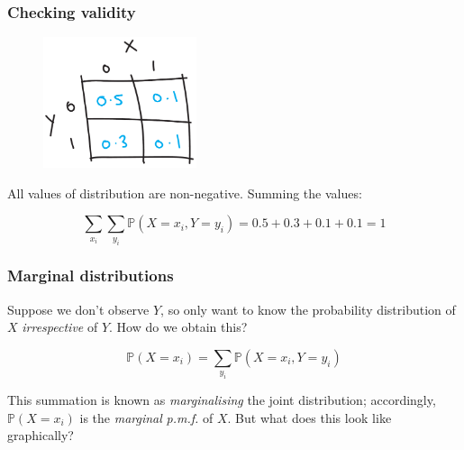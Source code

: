 \documentclass{beamer}
\begin{document}
	\begin{frame}
		\frametitle{Checking validity}
		
		\begin{figure}[ht]
			\centerline{\includegraphics[width=0.4\textwidth]{./figures/horse_race_base.pdf}}
		\end{figure}
		
		All values of distribution are non-negative. Summing the values:
		
		\begin{equation}
		\sum_{x_i} \sum_{y_i} \mathbb{P}(X=x_i, Y=y_i) = 0.5 + 0.3 + 0.1 + 0.1 = 1
		\end{equation}
		
	\end{frame}
	
	\begin{frame}
		\frametitle{Marginal distributions}
		
		Suppose we don't observe $Y$, so only want to know the probability distribution of $X$ \textit{irrespective} of $Y$. How do we obtain this?
		
		\begin{equation}
		\mathbb{P}(X=x_i) = \sum_{y_i} \mathbb{P}(X=x_i, Y=y_i)
		\end{equation}
		
		This summation is known as \textit{marginalising} the joint distribution; accordingly, $\mathbb{P}(X=x_i)$ is the \textit{marginal} \textit{p.m.f.} of $X$. But what does this look like graphically? 
		
	\end{frame}
	
\end{document}
